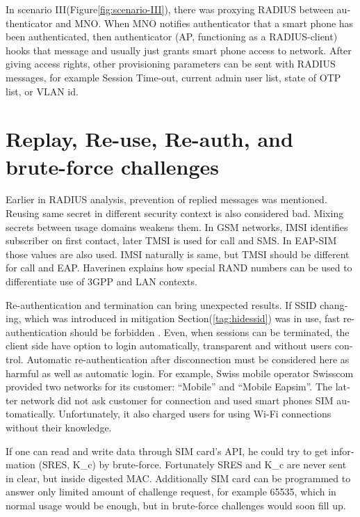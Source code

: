 \documentclass[12pt,a4paper,english]{tutthesis}
\begin{document}
\begin{otherlanguage}{english}
In scenario III(Figure\ref{fig:scenario-III}),  there was proxying RADIUS between authenticator
and MNO.  When MNO notifies authenticator
that a smart phone has been authenticated, then authenticator (AP, functioning
as a RADIUS-client) hooks that message and usually just grants smart
phone access to network. After giving access rights, other
provisioning parameters can be sent with RADIUS messages, for example
Session Time-out,
current admin user list, state of OTP list, or VLAN id.


\section{Replay, Re-use, Re-auth, and brute-force challenges}
\label{sec-6-8}
Earlier in RADIUS analysis, prevention of replied messages was
mentioned. Reusing same secret in different security context is also
considered bad.  Mixing secrets between usage
domains weakens them.  In GSM networks, IMSI identifies subscriber on
first contact, later TMSI is used for call and SMS.  In EAP-SIM those
values are also used. IMSI naturally is same, but TMSI should be
different for call and EAP.  Haverinen \cite{hav-doc} explains how
special RAND numbers can be used to differentiate use of 3GPP and LAN
contexts.

Re-authentication and termination can bring unexpected results.
If SSID changing, which was introduced in mitigation Section(\ref{tag:hidessid}) was in use, fast re-authentication
should be forbidden \cite[p.11]{rfc5448}.
Even, when sessions can be terminated, the client side have 
option to login automatically, transparent and without users control.
Automatic re-authentication after disconnection  must be considered
here as harmful as well as automatic login. For example,
Swiss mobile operator Swisscom provided two networks for its customer:
``Mobile'' and ``Mobile Eapsim''. The latter network did not ask customer
for connection and used smart phones SIM automatically. Unfortunately,
it also charged users for using Wi-Fi connections without their 
knowledge. \cite{swisscom}





If one can read and write data through SIM card's API,
he could try to get information (SRES, K\_c) by brute-force. 
Fortunately SRES and K\_c are never sent in clear, but inside
digested MAC. Additionally SIM card can be programmed to answer only
limited amount of challenge request, for example 65535, which in
normal usage would be enough, but in brute-force challenges 
would soon fill up.



\end{otherlanguage}
\end{document}
